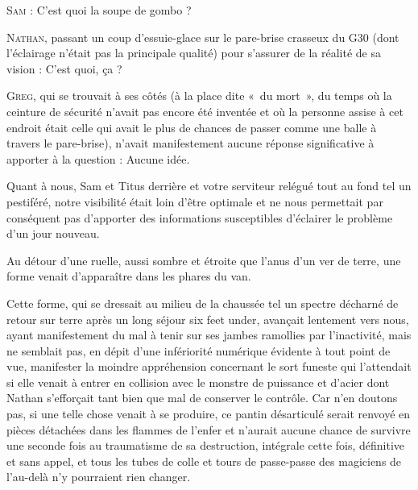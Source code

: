 \begin{dialogue}
\textsc{Sam} : C’est quoi la soupe de gombo ?

\textsc{Nathan}, passant un coup d’essuie-glace sur le pare-brise crasseux du G30 (dont l’éclairage n’était pas la principale qualité) pour s’assurer de la réalité de sa vision : C’est quoi, ça ?

\textsc{Greg}, qui se trouvait à ses côtés (à la place dite «~du mort~», du temps où la ceinture de sécurité n’avait pas encore été inventée et où la personne assise à cet endroit était celle qui avait le plus de chances de passer comme une balle à travers le pare-brise), n’avait manifestement aucune réponse significative à apporter à la question : Aucune idée.

\end{dialogue}

Quant à nous, Sam et Titus derrière et votre serviteur relégué tout au fond tel un pestiféré, notre visibilité était loin d’être optimale et ne nous permettait par conséquent pas d’apporter des informations susceptibles d’éclairer le problème d’un jour nouveau.

Au détour d’une ruelle, aussi sombre et étroite que l’anus d’un ver de terre, une forme venait d’apparaître dans les phares du van.

Cette forme, qui se dressait au milieu de la chaussée tel un spectre décharné de retour sur terre après un long séjour six feet under, avançait lentement vers nous, ayant manifestement du mal à tenir sur ses jambes ramollies par l’inactivité, mais ne semblait pas, en dépit d’une infériorité numérique évidente à tout point de vue, manifester la moindre appréhension concernant le sort funeste qui l’attendait si elle venait à entrer en collision avec le monstre de puissance et d’acier dont Nathan s’efforçait tant bien que mal de conserver le contrôle. Car n’en doutons pas, si une telle chose venait à se produire, ce pantin désarticulé serait renvoyé en pièces détachées dans les flammes de l’enfer et n’aurait aucune chance de survivre une seconde fois au traumatisme de sa destruction, intégrale cette fois, définitive et sans appel, et tous les tubes de colle et tours de passe-passe des magiciens de l’au-delà n’y pourraient rien changer.


